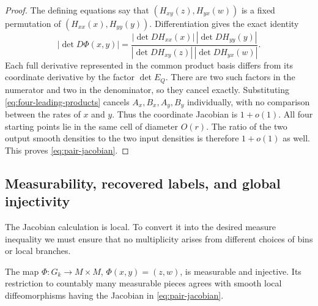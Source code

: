 \begin{proof}
The defining equations say that
$(H_{xy}(z),H_{yx}(w))$ is a fixed permutation of
$(H_{xx}(x),H_{yy}(y))$.  Differentiation gives the exact identity
\begin{equation}\label{eq:exact-switch-determinant}
 |\det D\Phi(x,y)|=
 \frac{|\det DH_{xx}(x)|\,|\det DH_{yy}(y)|}
 {|\det DH_{xy}(z)|\,|\det DH_{yx}(w)|}.
\end{equation}
Each full derivative represented in the common product basis differs
from its coordinate derivative by the factor $\det E_Q$.  There are
two such factors in the numerator and two in the denominator, so
they cancel exactly.  Substituting \eqref{eq:four-leading-products}
cancels $A_x,B_x,A_y,B_y$ individually, with no comparison between the
rates of $x$ and $y$.  Thus the coordinate Jacobian is $1+o(1)$.
All four starting points lie in the same cell of diameter $O(r)$.
The ratio of the two output smooth densities to the two input densities
is therefore $1+o(1)$ as well.  This proves
\eqref{eq:pair-jacobian}.
\end{proof}

\subsection{Measurability, recovered labels, and global injectivity}

The Jacobian calculation is local.  To convert it into the desired
measure inequality we must ensure that no multiplicity arises from
different choices of bins or local branches.

\begin{lemma}\label{lem:switch-injective}
The map $\Phi:G_k\to M\times M$, $\Phi(x,y)=(z,w)$, is measurable
and injective.  Its restriction to countably many measurable pieces
agrees with smooth local diffeomorphisms having the Jacobian in
\eqref{eq:pair-jacobian}.
\end{lemma}

